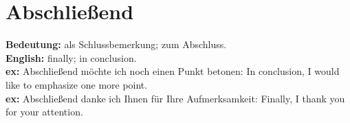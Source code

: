 \documentclass[a4paper]{article}
\begin{document}
    
    \section{Abschließend}
        \textbf{Bedeutung:} als Schlussbemerkung; zum Abschluss.\\
        \textbf{English:} finally; in conclusion.\\
        \textbf{ex:} Abschließend möchte ich noch einen Punkt betonen: In conclusion, I would like to emphasize one more point.\\
        \textbf{ex:} Abschließend danke ich Ihnen für Ihre Aufmerksamkeit: Finally, I thank you for your attention.
        
        
\end{document}
